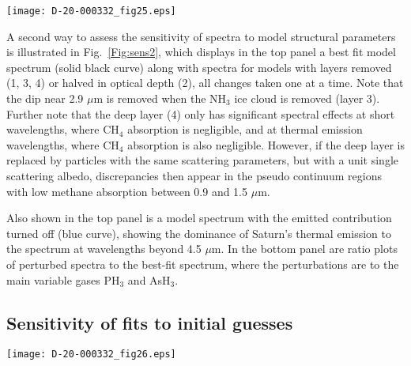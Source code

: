 \documentclass[article,11pt]{emulateapj}
\def\ashtx{AsH$_3$}
\def\mum{$\mu$m }
\def\mumx{$\mu$m}
\def\chf{CH$_4$ }
\def\pht{PH$_3$ }
\def\nht{NH$_3$ }
\begin{document}
\begin{figure*}[!htb]\centering
\texttt{[image: D-20-000332\_fig25.eps]}
\caption{{\bf Top:} Best-fit 2016 model spectrum for location 6 in Fig.\ \ref{Fig:vimsvis2016},
with perturbed spectra for one at a time perturbations of each model layer as indicated in the legend.
Also shown is model spectrum with Saturn's thermal emission turned off (blue curve). {\bf Bottom:} Ratio
of spectra with perturbed gas parameters to the unperturbed spectrum.}
\label{Fig:sens2}
\end{figure*}

A second way to assess the sensitivity of spectra to model structural
parameters is illustrated in Fig.\ \ref{Fig:sens2}, which displays in
the top panel a best fit model spectrum (solid black curve) along with
spectra for models with layers removed (1, 3, 4) or halved in optical
depth (2), all changes taken one at a time. Note that the dip near 2.9
\mum is removed when the \nht ice cloud is removed (layer 3).  Further
note that the deep layer (4) only has significant spectral effects at
short wavelengths, where \chf absorption is negligible, and at thermal
emission wavelengths, where \chf absorption is also
negligible. However, if the deep layer is replaced by particles with
the same scattering parameters, but with a unit single scattering
albedo, discrepancies then appear in the pseudo continuum regions with
low methane absorption between 0.9 and 1.5 \mumx.


Also shown in the top panel is a model spectrum with the emitted contribution turned off (blue curve),
showing the dominance of Saturn's thermal emission to the spectrum at wavelengths beyond 4.5 \mumx.
In the bottom panel are ratio plots of perturbed spectra to the best-fit spectrum, where
the perturbations are to the main variable gases \pht and \ashtx.



\subsection{Sensitivity of fits to initial guesses}

\begin{figure*}[!t]\centering
\texttt{[image: D-20-000332\_fig26.eps]}\par
\caption{Effects of different initial values on best fit parameters. The gray
dots show the initial parameter values, the filled circles the initial fit to spectrum 2016-6,
and the open circles indicate fit results for initial values perturbed
from best fit values.  Each parameter is plotted as a ratio to that parameter for the
initial fit (that is why the first fit results are all on the unit line).}\label{Fig:perturb}
\end{figure*}
\end{document}

